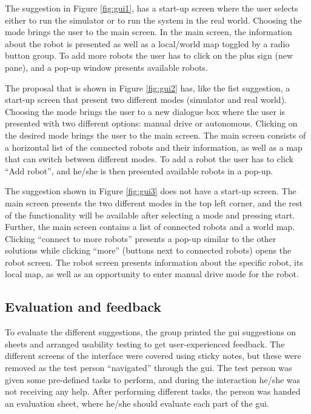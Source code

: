 The suggestion in Figure \ref{fig:gui1}, has a start-up screen where the user selects either to run the simulator or to run the system in the real world. Choosing the mode brings the user to the main screen. In the main screen, the information about the robot is presented as well as a local/world map toggled by a radio button group. To add more robots the user has to click on the plus sign (new pane), and a pop-up window presents available robots.

The proposal that is shown in Figure \ref{fig:gui2} has, like the fist suggestion, a start-up screen that present two different modes (simulator and real world). Choosing the mode brings the user to a new dialogue box where the user is presented with two different options: manual drive or autonomous. Clicking on the desired mode brings the user to the main screen. The main screen consists of a horizontal list of the connected robots and their information, as well as a map that can switch between different modes. To add a robot the user has to click ``Add robot'', and he/she is then presented available robots in a pop-up.

The suggestion shown in Figure \ref{fig:gui3} does not have a start-up screen. The main screen presents the two different modes in the top left corner, and the rest of the functionality will be available after selecting a mode and pressing start. Further, the main screen contains a list of connected robots and a world map. Clicking ``connect to more robots'' presents a pop-up similar to the other solutions while clicking ``more'' (buttons next to connected robots) opens the robot screen. The robot screen presents information about the specific robot, its local map, as well as an opportunity to enter manual drive mode for the robot.

\subsection{Evaluation and feedback}
\label{sec:evalandfeedback}
To evaluate the different suggestions, the group printed the \acrshort{gui} suggestions on sheets and arranged usability testing to get user-experienced feedback. The different screens of the interface were covered using sticky notes, but these were removed as the test person ``navigated'' through the \acrshort{gui}. The test person was given some pre-defined tasks to perform, and during the interaction he/she was not receiving any help. After performing different tasks, the person was handed an evaluation sheet, where he/she should evaluate each part of the \acrshort{gui}.


